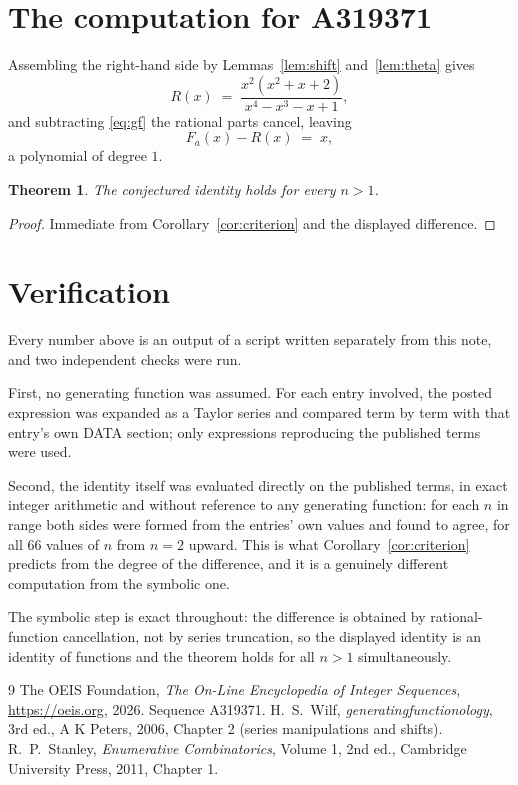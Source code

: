 \documentclass[11pt,a4paper]{article}
\theoremstyle{plain}
\newtheorem{theorem}{Theorem}
\theoremstyle{definition}
\begin{document}
\section{The computation for A319371}

Assembling the right-hand side by Lemmas~\ref{lem:shift} and~\ref{lem:theta} gives
\[
R(x)\;=\;\frac{x^{2} \left(x^{2} + x + 2\right)}{x^{4} - x^{3} - x + 1} ,
\]
and subtracting \eqref{eq:gf} the rational parts cancel, leaving
\[
F_{a}(x)-R(x)\;=\;x ,
\]
a polynomial of degree $1$.

\begin{theorem}
The conjectured identity holds for every $n>1$.
\end{theorem}

\begin{proof}
Immediate from Corollary~\ref{cor:criterion} and the displayed difference.
\end{proof}

\section{Verification}

Every number above is an output of a script written separately from this note, and two
independent checks were run.

First, no generating function was assumed. For each entry involved, the posted expression
was expanded as a Taylor series and compared term by term with that entry's own DATA
section; only expressions reproducing the published terms were used.

Second, the identity itself was evaluated directly on the published terms, in exact
integer arithmetic and without reference to any generating function: for each $n$ in range
both sides were formed from the entries' own values and found to agree, for all 66
values of $n$ from $n=2$ upward. This is what Corollary~\ref{cor:criterion}
predicts from the degree of the difference, and it is a genuinely different computation
from the symbolic one.

The symbolic step is exact throughout: the difference is obtained by rational-function
cancellation, not by series truncation, so the displayed identity is an identity of
functions and the theorem holds for all $n>1$ simultaneously.

\begin{thebibliography}{9}
 The OEIS Foundation, \emph{The On-Line Encyclopedia of Integer Sequences},
\url{https://oeis.org}, 2026. Sequence A319371.
 H.~S.~Wilf, \emph{generatingfunctionology}, 3rd ed., A K Peters, 2006,
Chapter 2 (series manipulations and shifts).
 R.~P.~Stanley, \emph{Enumerative Combinatorics}, Volume 1, 2nd ed.,
Cambridge University Press, 2011, Chapter 1.
\end{thebibliography}
\end{document}
